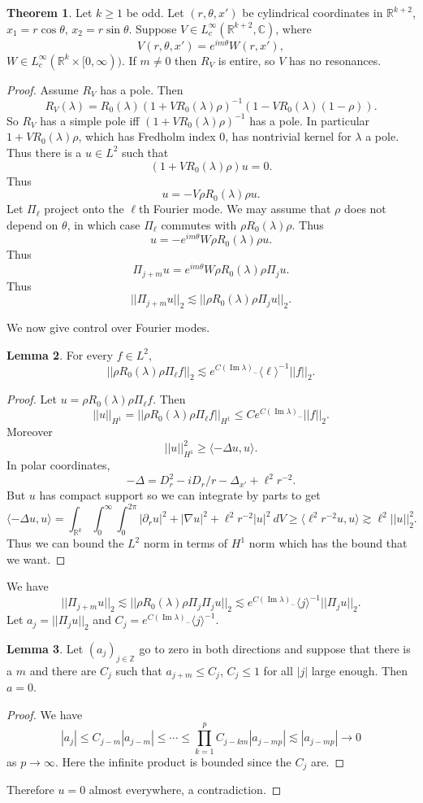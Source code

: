 \documentclass[12pt]{report}
\newcommand{\ZZ}{\mathbb{Z}}
\newcommand{\RR}{\mathbb{R}}
\newcommand{\CC}{\mathbb{C}}
\renewcommand{\Im}{\operatorname{Im}}
\theoremstyle{definition}
\newtheorem{theorem}{Theorem}[chapter]
\newtheorem{lemma}[theorem]{Lemma}
\begin{document}
\begin{theorem}
Let $k \geq 1$ be odd.
Let $(r, \theta, x')$ be cylindrical coordinates in $\RR^{k+2}$, $x_1 = r\cos\theta$, $x_2 = r\sin\theta$.
Suppose $V \in L^\infty_c(\RR^{k+2}, \CC)$, where
$$V(r, \theta, x') = e^{im\theta}W(r, x'),$$
$W \in L^\infty_c(\RR^k \times [0, \infty))$.
If $m \neq 0$ then $R_V$ is entire, so $V$ has no resonances.
\end{theorem}
\begin{proof}
Assume $R_V$ has a pole. Then
$$R_V(\lambda) = R_0(\lambda)(1 + VR_0(\lambda)\rho)^{-1}(1 - VR_0(\lambda)(1 - \rho)).$$
So $R_V$ has a simple pole iff $(1 + VR_0(\lambda)\rho)^{-1}$ has a pole.
In particular $1 + VR_0(\lambda)\rho$, which has Fredholm index $0$, has nontrivial kernel for $\lambda$ a pole. Thus there is a $u \in L^2$ such that
$$(1 + VR_0(\lambda)\rho)u = 0.$$
Thus
$$u = -V\rho R_0(\lambda)\rho u.$$
Let $\Pi_\ell$ project onto the $\ell$th Fourier mode.
We may assume that $\rho$ does not depend on $\theta$, in which case $\Pi_\ell$ commutes with $\rho R_0(\lambda) \rho$.
Thus
$$u = -e^{im\theta}W\rho R_0(\lambda)\rho u.$$
Thus
$$\Pi_{j+m}u = e^{im\theta}W\rho R_0(\lambda)\rho \Pi_j u.$$
Thus
$$||\Pi_{j+m}u||_2 \lesssim ||\rho R_0(\lambda) \rho \Pi_j u||_2.$$

We now give control over Fourier modes.
\begin{lemma}
For every $f \in L^2$,
$$||\rho R_0(\lambda)\rho \Pi_\ell f||_2 \lesssim e^{C(\Im \lambda)_-}\langle \ell\rangle^{-1}||f||_2.$$
\end{lemma}
\begin{proof}
Let $u = \rho R_0(\lambda)\rho \Pi_\ell f$. Then
$$||u||_{H^1} = ||\rho R_0(\lambda)\rho \Pi_\ell f||_{H^1} \leq Ce^{C(\Im \lambda)_-}||f||_2.$$
Moreover
$$||u||_{H^1}^2 \geq \langle -\Delta u, u\rangle.$$
In polar coordinates,
$$-\Delta = D_r^2 - iD_r/r - \Delta_{x'} + \ell^2 r^{-2}.$$
But $u$ has compact support so we can integrate by parts to get
$$\langle -\Delta u, u\rangle = \int_{\RR^k} \int_0^\infty \int_0^{2\pi} |\partial_ru|^2 + |\nabla u|^2 + \ell^2r^{-2}|u|^2~dV \geq \langle \ell^2r^{-2} u, u \rangle \gtrsim \ell^2 ||u||_2^2.$$
Thus we can bound the $L^2$ norm in terms of $H^1$ norm which has the bound that we want.
\end{proof}
We have
$$||\Pi_{j+m}u||_2 \lesssim ||\rho R_0(\lambda)\rho \Pi_j \Pi_j u||_2 \lesssim e^{C(\Im \lambda)_-}\langle j\rangle^{-1}||\Pi_j u||_2.$$
Let $a_j = ||\Pi_j u||_2$ and $C_j =  e^{C(\Im \lambda)_-}\langle j\rangle^{-1}$.
\begin{lemma}
Let $(a_j)_{j \in \ZZ}$ go to zero in both directions and suppose that there is a $m$ and there are $C_j$ such that $a_{j+m} \leq C_j$, $C_j \leq 1$ for all $|j|$ large enough. Then $a = 0$.
\end{lemma}
\begin{proof}
We have
$$|a_j| \leq C_{j-m}|a_{j-m}| \leq \cdots \leq \prod_{k=1}^p C_{j-km}|a_{j-mp}| \lesssim |a_{j-mp}| \to 0$$
as $p \to \infty$. Here the infinite product is bounded since the $C_j$ are.
\end{proof}
Therefore $u = 0$ almost everywhere, a contradiction.
\end{proof}
\end{document}
